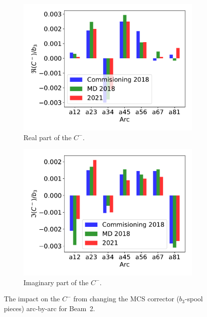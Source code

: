 \documentclass[a4paper]{cernatsnote}
\begin{document}
\begin{figure}[ht]
\begin{subfigure}{.5\textwidth}
  \centering
  \includegraphics[width=.8\linewidth]{plots/MCS/b2_change_re_per_b3.pdf}  
  \caption{Real part of the $C^-$.}
\end{subfigure}
\begin{subfigure}{.5\textwidth}
  \centering
  \includegraphics[width=.8\linewidth]{plots/MCS/b_2change_im_per_b3.pdf}  
  \caption{Imaginary part of the $C^-$.}
\end{subfigure}
\caption{The impact on the $C^-$ from changing the MCS corrector ($b_3$-spool pieces) arc-by-arc for Beam~2.}
\label{fig:beam2_mcs}
\end{figure}
\end{document}
